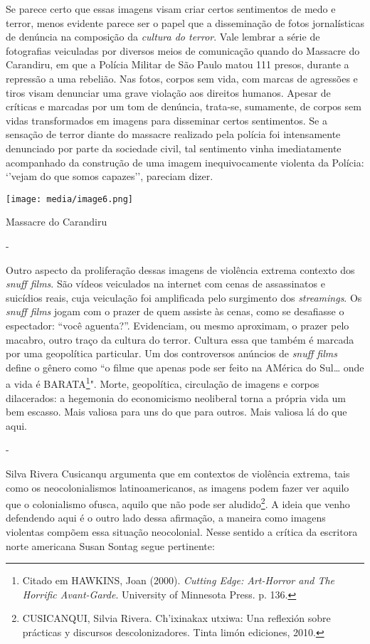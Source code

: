Se parece certo que essas imagens visam criar certos sentimentos de medo
e terror, menos evidente parece ser o papel que a disseminação de fotos
jornalísticas de denúncia na composição da \emph{cultura do terror}.
Vale lembrar a série de fotografias veiculadas por diversos meios de
comunicação quando do Massacre do Carandiru, em que a Polícia Militar de
São Paulo matou 111 presos, durante a repressão a uma rebelião. Nas
fotos, corpos sem vida, com marcas de agressões e tiros visam denunciar
uma grave violação aos direitos humanos. Apesar de críticas e marcadas
por um tom de denúncia, trata-se, sumamente, de corpos sem vidas
transformados em imagens para disseminar certos sentimentos. Se a
sensação de terror diante do massacre realizado pela polícia foi
intensamente denunciado por parte da sociedade civil, tal sentimento
vinha imediatamente acompanhado da construção de uma imagem
inequivocamente violenta da Polícia: `'vejam do que somos capazes'',
pareciam dizer.

\texttt{[image: media/image6.png]}

Massacre do Carandiru

-

Outro aspecto da proliferação dessas imagens de violência extrema
contexto dos \emph{snuff films}. São vídeos veiculados na internet com
cenas de assassinatos e suicídios reais, cuja veiculação foi amplificada
pelo surgimento dos \emph{streamings}. Os \emph{snuff films} jogam com o
prazer de quem assiste às cenas, como se desafiasse o espectador: ``você
aguenta?''. Evidenciam, ou mesmo aproximam, o prazer pelo macabro, outro
traço da cultura do terror. Cultura essa que também é marcada por uma
geopolítica particular. Um dos controversos anúncios de \emph{snuff
films} define o gênero como ``o filme que apenas pode ser feito na
AMérica do Sul\ldots{} onde a vida é BARATA\footnote{Citado em HAWKINS,
  Joan (2000). \emph{Cutting Edge: Art-Horror and The Horrific
  Avant-Garde}. University of Minnesota Press. p. 136.}". Morte,
geopolítica, circulação de imagens e corpos dilacerados: a hegemonia do
economicismo neoliberal torna a própria vida um bem escasso. Mais
valiosa para uns do que para outros. Mais valiosa lá do que aqui.

-

Silva Rivera Cusicanqu argumenta que em contextos de violência extrema,
tais como os neocolonialismos latinoamericanos, as imagens podem fazer
ver aquilo que o colonialismo ofusca, aquilo que não pode ser
aludido\footnote{CUSICANQUI, Silvia Rivera. Ch'ixinakax utxiwa: Una
  reflexión sobre prácticas y discursos descolonizadores. Tinta limón
  ediciones, 2010.}. A ideia que venho defendendo aqui é o outro lado
dessa afirmação, a maneira como imagens violentas compõem essa situação
neocolonial. Nesse sentido a crítica da escritora norte americana Susan
Sontag segue pertinente:


